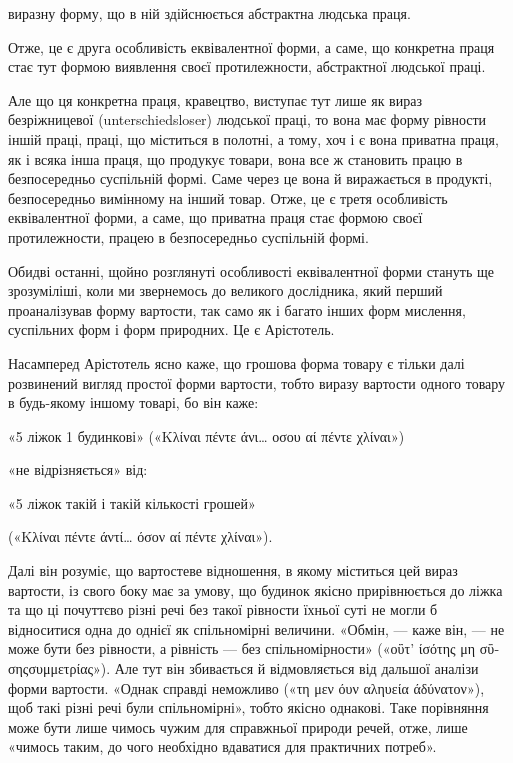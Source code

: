 \parcont{}  %
виразну форму, що в ній здійснюється абстрактна людська праця.

Отже, це є друга особливість еквівалентної форми, а саме, що конкретна праця стає тут формою
виявлення своєї протилежности,
абстрактної людської праці.

Але що ця конкретна праця, кравецтво, виступає тут лише як вираз безріжницевої (unterschiedsloser)
людської праці, то вона має форму рівности іншій праці, праці, що міститься в полотні, а тому, хоч і
є вона приватна праця, як і всяка інша праця, що продукує товари, вона все ж становить працю в
безпосередньо суспільній формі. Саме через це вона й виражається в продукті, безпосередньо вимінному
на інший товар. Отже, це є третя особливість еквівалентної форми, а саме, що приватна праця стає
формою своєї протилежности, працею в безпосередньо суспільній формі.

Обидві останні, щойно розглянуті особливості еквівалентної форми стануть ще зрозуміліші, коли ми
звернемось до великого дослідника, який перший проаналізував форму вартости, так само як і багато
інших форм мислення, суспільних форм і форм природних. Це є Арістотель.

Насамперед Арістотель ясно каже, що грошова форма товару є тільки далі розвинений вигляд простої
форми вартости, тобто виразу вартости одного товару в будь-якому іншому товарі, бо він каже:

\noindent{}\begin{minipage}{\textwidth}
\begin{center}
«5 ліжок \deq{} 1 будинкові»
(«\textgreek{Κλίναι πέντε άνι\dots{} οσου αί πέντε χλίναι}»)

«не відрізняється» від:

«5 ліжок \deq{} такій і такій кількості грошей»

(«\textgreek{Κλίναι πέντε άντί\dots{} όσον αί πέντε χλίναι}»).
\end{center}
\medskip
\end{minipage}

\noindent{}Далі він розуміє, що вартостеве відношення, в якому міститься цей вираз вартости, із свого боку має
за умову, що будинок якісно прирівнюється до ліжка та що ці почуттєво різні речі без такої рівности
їхньої суті не могли б відноситися одна до однієї як спільномірні величини. «Обмін, — каже він, — не
може бути без рівности, а рівність — без спільномірности» («\textgreek{οΰτ’ ίσότης μη σΰσηςσυμμετρίας}»). Але
тут він збивається й відмовляється від дальшої аналізи форми вартости. «Однак справді неможливо
(«\textgreek{τη μεν όυν αληυεία άδύνατον}»), щоб такі різні речі були спільномірні», тобто якісно однакові. Таке
порівняння може бути лише чимось чужим для справжньої природи речей, отже, лише «чимось таким, до
чого необхідно вдаватися для практичних потреб».

